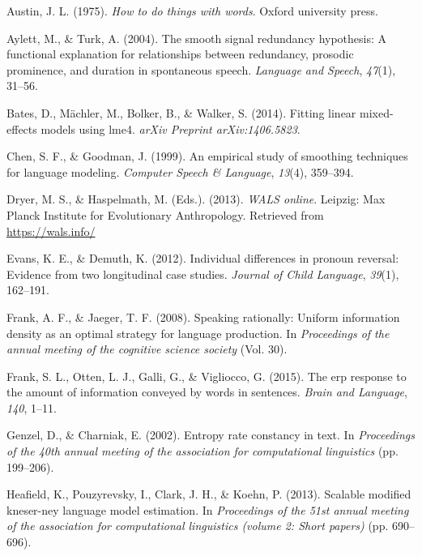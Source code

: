\documentclass[man,floatsintext]{apa6}
\begin{document}
\leavevmode\hypertarget{ref-austin1975}{}%
Austin, J. L. (1975). \emph{How to do things with words}. Oxford university press.

\leavevmode\hypertarget{ref-aylett2004}{}%
Aylett, M., \& Turk, A. (2004). The smooth signal redundancy hypothesis: A functional explanation for relationships between redundancy, prosodic prominence, and duration in spontaneous speech. \emph{Language and Speech}, \emph{47}(1), 31--56.

\leavevmode\hypertarget{ref-bates2014}{}%
Bates, D., Mächler, M., Bolker, B., \& Walker, S. (2014). Fitting linear mixed-effects models using lme4. \emph{arXiv Preprint arXiv:1406.5823}.

\leavevmode\hypertarget{ref-chen1999empirical}{}%
Chen, S. F., \& Goodman, J. (1999). An empirical study of smoothing techniques for language modeling. \emph{Computer Speech \& Language}, \emph{13}(4), 359--394.

\leavevmode\hypertarget{ref-wals}{}%
Dryer, M. S., \& Haspelmath, M. (Eds.). (2013). \emph{WALS online}. Leipzig: Max Planck Institute for Evolutionary Anthropology. Retrieved from \url{https://wals.info/}

\leavevmode\hypertarget{ref-evans2012}{}%
Evans, K. E., \& Demuth, K. (2012). Individual differences in pronoun reversal: Evidence from two longitudinal case studies. \emph{Journal of Child Language}, \emph{39}(1), 162--191.

\leavevmode\hypertarget{ref-frank2008}{}%
Frank, A. F., \& Jaeger, T. F. (2008). Speaking rationally: Uniform information density as an optimal strategy for language production. In \emph{Proceedings of the annual meeting of the cognitive science society} (Vol. 30).

\leavevmode\hypertarget{ref-frank2015}{}%
Frank, S. L., Otten, L. J., Galli, G., \& Vigliocco, G. (2015). The erp response to the amount of information conveyed by words in sentences. \emph{Brain and Language}, \emph{140}, 1--11.

\leavevmode\hypertarget{ref-genzel2002}{}%
Genzel, D., \& Charniak, E. (2002). Entropy rate constancy in text. In \emph{Proceedings of the 40th annual meeting of the association for computational linguistics} (pp. 199--206).

\leavevmode\hypertarget{ref-heafield2013scalable}{}%
Heafield, K., Pouzyrevsky, I., Clark, J. H., \& Koehn, P. (2013). Scalable modified kneser-ney language model estimation. In \emph{Proceedings of the 51st annual meeting of the association for computational linguistics (volume 2: Short papers)} (pp. 690--696).
\end{document}
